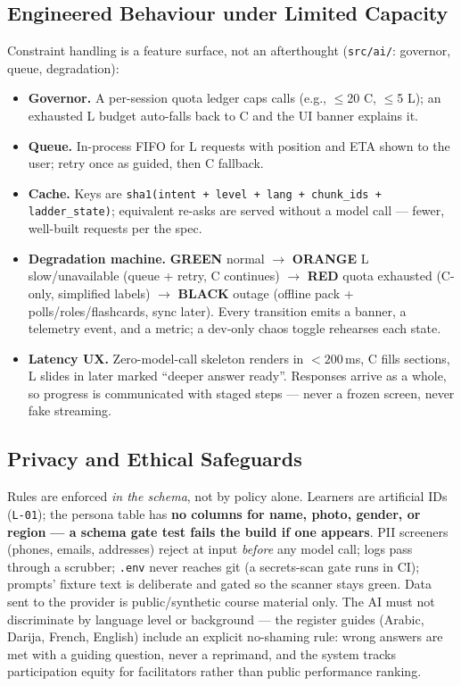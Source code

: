 \documentclass[10pt,twocolumn]{IEEEtran}
\newcommand{\trip}[1]{\textcolor{accg}{\textbf{#1}}}
\begin{document}
\subsection{Engineered Behaviour under Limited Capacity}
Constraint handling is a feature surface, not an afterthought (\texttt{src/ai/}: governor, queue, degradation):

\begin{itemize}
\item \textbf{Governor.} A per-session quota ledger caps calls (e.g., $\leq$20 C, $\leq$5 L); an exhausted L budget auto-falls back to C and the UI banner explains it.
\item \textbf{Queue.} In-process FIFO for L requests with position and ETA shown to the user; retry once as guided, then C fallback.
\item \textbf{Cache.} Keys are \texttt{sha1(intent + level + lang + chunk\_ids + ladder\_state)}; equivalent re-asks are served without a model call --- fewer, well-built requests per the spec.
\item \textbf{Degradation machine.} \trip{GREEN} normal $\rightarrow$ \trip{ORANGE} L slow/unavailable (queue + retry, C continues) $\rightarrow$ \trip{RED} quota exhausted (C-only, simplified labels) $\rightarrow$ \trip{BLACK} outage (offline pack + polls/roles/flashcards, sync later). Every transition emits a banner, a telemetry event, and a metric; a dev-only chaos toggle rehearses each state.
\item \textbf{Latency UX.} Zero-model-call skeleton renders in $<200$\,ms, C fills sections, L slides in later marked ``deeper answer ready''. Responses arrive as a whole, so progress is communicated with staged steps --- never a frozen screen, never fake streaming.
\end{itemize}

\subsection{Privacy and Ethical Safeguards}
Rules are enforced \emph{in the schema}, not by policy alone. Learners are artificial IDs (\texttt{L-01}); the persona table has \textbf{no columns for name, photo, gender, or region} \trip{--- a schema gate test fails the build if one appears}. PII screeners (phones, emails, addresses) reject at input \emph{before} any model call; logs pass through a scrubber; \texttt{.env} never reaches git (a secrets-scan gate runs in CI); prompts' fixture text is deliberate and gated so the scanner stays green. Data sent to the provider is public/synthetic course material only. The AI must not discriminate by language level or background --- the register guides (Arabic, Darija, French, English) include an explicit no-shaming rule: wrong answers are met with a guiding question, never a reprimand, and the system tracks participation equity for facilitators rather than public performance ranking.
\end{document}

